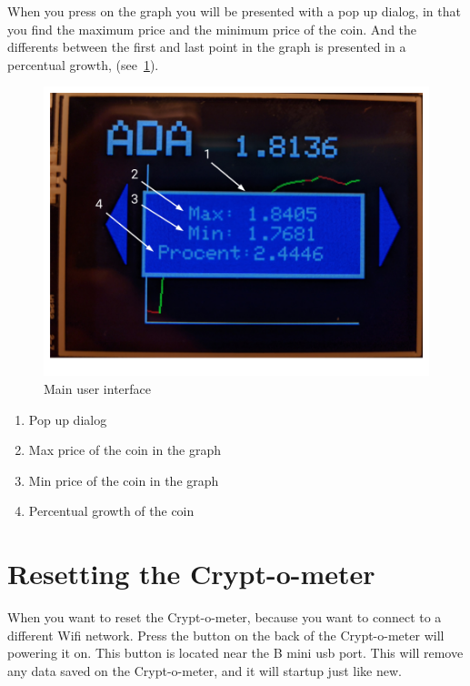 \documentclass[11pt]{article}
\begin{document}
    When you press on the graph you will be presented with a pop up dialog, in that you find the maximum price and the minimum price of the coin.
    And the differents between the first and last point in the graph is presented in a percentual growth, (see~\textcolor{blue}{\cref{fig:pop_ui}}).

    \begin{figure}[H]
        \centering
        \includegraphics[width=\textwidth]{screen_2}
        \caption{Main user interface}
        \label{fig:pop_ui}
    \end{figure}

    \begin{enumerate}
        \item Pop up dialog
        \item Max price of the coin in the graph
        \item Min price of the coin in the graph
        \item Percentual growth of the coin
    \end{enumerate}

    \newpage

    \section{Resetting the Crypt-o-meter}\label{sec:resetting-the-crypt-o-meter}
    When you want to reset the Crypt-o-meter, because you want to connect to a different Wifi network.
    Press the button on the back of the Crypt-o-meter will powering it on.
    This button is located near the B mini usb port.
    This will remove any data saved on the Crypt-o-meter, and it will startup just like new.
\end{document}

